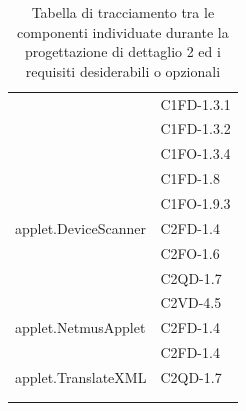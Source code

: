 \begin{footnotesize}
\begin{longtable}[!h]{|l|l|}
& C1FD-1.3.1\\
& C1FD-1.3.2\\
& C1FO-1.3.4\\
& C1FD-1.8\\
& C1FO-1.9.3\\\hline 
applet.DeviceScanner  &  C2FD-1.4\\
& C2FO-1.6\\
& C2QD-1.7\\
& C2VD-4.5\\\hline
applet.NetmusApplet  &  C2FD-1.4 \\
& C2FD-1.4\\\hline
applet.TranslateXML  &  C2QD-1.7\\
& \\\hline
\caption{Tabella di tracciamento tra le componenti individuate durante la
progettazione di dettaglio 2 ed i requisiti desiderabili o opzionali}
\end{longtable}
\end{footnotesize}


